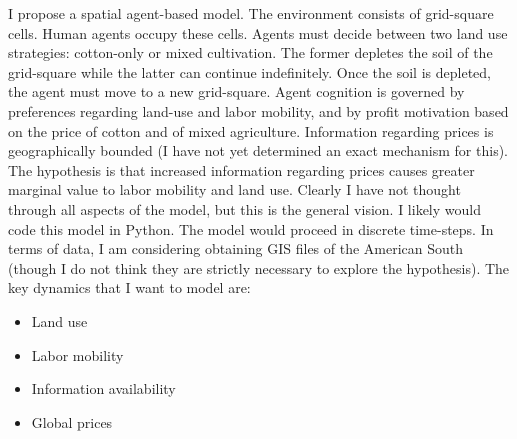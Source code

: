 \documentclass{article}
\begin{document}
I propose a spatial agent-based model. The environment consists of grid-square
cells. Human agents occupy these cells. Agents must decide between two land use
strategies: cotton-only or mixed cultivation. The former depletes the soil of
the grid-square while the latter can continue indefinitely. Once the soil is
depleted, the agent must move to a new grid-square. Agent cognition is governed
by preferences regarding land-use and labor mobility, and by profit motivation
based on the price of cotton and of mixed agriculture. Information regarding
prices is geographically bounded (I have not yet determined an exact mechanism
for this). The hypothesis is that increased information regarding prices causes
greater marginal value to labor mobility and land use. Clearly I have not
thought through all aspects of the model, but this is the general vision. I
likely would code this model in Python. The model would proceed in discrete
time-steps. In terms of data, I am considering obtaining GIS files of the
American South (though I do not think they are strictly necessary to explore the
hypothesis). The key dynamics that I want to model are:
\begin{itemize}
	\item Land use
	\item Labor mobility
	\item Information availability
	\item Global prices
\end{itemize}

\nocite{*}

\medskip
\printbibliography[title={}]
\end{document}
